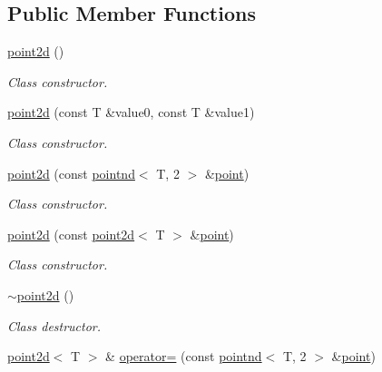 \subsection*{Public Member Functions}
\begin{DoxyCompactItemize}
\item 
\mbox{\label{classacme_1_1point2d_a1ebb66adbd7754b28e42a7049f09f12a}} 
\hyperlink{classacme_1_1point2d_a1ebb66adbd7754b28e42a7049f09f12a}{point2d} ()
\begin{DoxyCompactList}\small\item\em Class constructor. \end{DoxyCompactList}\item 
\hyperlink{classacme_1_1point2d_a850b6a667ca69c35114ac1ec83a68f2d}{point2d} (const T \&value0, const T \&value1)
\begin{DoxyCompactList}\small\item\em Class constructor. \end{DoxyCompactList}\item 
\hyperlink{classacme_1_1point2d_a01471e5d6f2b7e1851499a9d16187ea5}{point2d} (const \hyperlink{classacme_1_1pointnd}{pointnd}$<$ T, 2 $>$ \&\hyperlink{classacme_1_1point}{point})
\begin{DoxyCompactList}\small\item\em Class constructor. \end{DoxyCompactList}\item 
\hyperlink{classacme_1_1point2d_aa13d8e0048a9936b017fe8e0f4f5cdf4}{point2d} (const \hyperlink{classacme_1_1point2d}{point2d}$<$ T $>$ \&\hyperlink{classacme_1_1point}{point})
\begin{DoxyCompactList}\small\item\em Class constructor. \end{DoxyCompactList}\item 
\mbox{\label{classacme_1_1point2d_ae1e790b48d7cb9b6f8e29142c4b3d51f}} 
\hyperlink{classacme_1_1point2d_ae1e790b48d7cb9b6f8e29142c4b3d51f}{$\sim$point2d} ()
\begin{DoxyCompactList}\small\item\em Class destructor. \end{DoxyCompactList}\item 
\hyperlink{classacme_1_1point2d}{point2d}$<$ T $>$ \& \hyperlink{classacme_1_1point2d_a1032b0e98d229f2d6d59aba5514b3c2f}{operator=} (const \hyperlink{classacme_1_1pointnd}{pointnd}$<$ T, 2 $>$ \&\hyperlink{classacme_1_1point}{point})

\end{DoxyCompactItemize}
